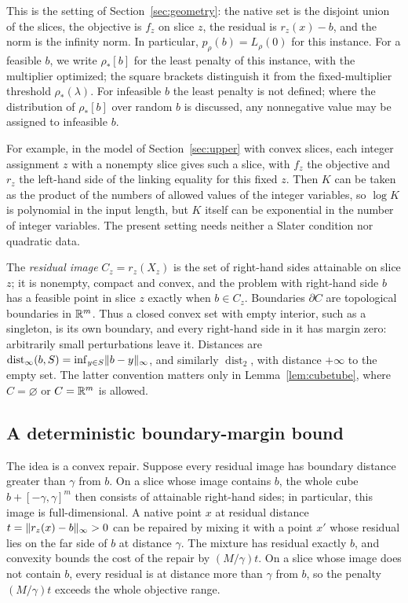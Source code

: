 This is the setting of Section~\ref{sec:geometry}: the native set is the
disjoint union of the slices, the objective is $f_z$ on slice $z$, the
residual is $r_z(x)-b$, and the norm is the infinity norm. In particular,
$p_\rho(b)=L_\rho(0)$ for this instance. For a feasible $b$, we write
$\rho_*[b]$ for the least penalty of this instance, with the multiplier
optimized; the square brackets distinguish it from the fixed-multiplier
threshold $\rho_*(\lambda)$. For infeasible $b$ the least penalty is not
defined; where the distribution of $\rho_*[b]$ over random $b$ is
discussed, any nonnegative value may be assigned to infeasible $b$.

For example, in the model of Section~\ref{sec:upper} with convex slices,
each integer assignment $z$ with a nonempty slice gives such a slice,
with $f_z$ the objective and $r_z$ the left-hand side of the linking
equality for this fixed $z$. Then $K$ can be taken as the product of the
numbers of allowed values of the integer variables, so $\log K$ is
polynomial in the input length, but $K$ itself can be exponential in the
number of integer variables. The present setting needs neither a Slater condition nor
quadratic data.

The \emph{residual image} $C_z=r_z(X_z)$ is the set of right-hand sides
attainable on slice $z$; it is nonempty, compact and convex, and the
problem with right-hand side $b$ has a feasible point in slice $z$
exactly when $b\in C_z$.
Boundaries $\partial C$ are topological boundaries in $\mathbb R^m$. Thus a
closed convex set with empty interior, such as a singleton, is its own
boundary, and every right-hand side in it has margin zero: arbitrarily
small perturbations leave it. Distances are
$\operatorname{dist}_\infty(b,S)=\inf_{y\in S}\lVert b-y\rVert_\infty$, and
similarly $\operatorname{dist}_2$, with distance $+\infty$ to the empty
set. The latter convention matters only in Lemma~\ref{lem:cubetube},
where $C=\varnothing$ or $C=\mathbb R^m$ is allowed.

\subsection{A deterministic boundary-margin bound}
The idea is a convex repair. Suppose every residual image has boundary
distance greater than $\gamma$ from $b$. On a slice whose image contains
$b$, the whole cube $b+[-\gamma,\gamma]^m$ then consists of attainable
right-hand sides; in particular, this image is full-dimensional. A native
point $x$ at residual distance $t=\lVert r_z(x)-b\rVert_\infty>0$ can be
repaired by mixing it with a point $x'$ whose residual lies on the far
side of $b$ at distance $\gamma$. The mixture has residual exactly $b$,
and convexity bounds the cost of the repair by $(M/\gamma)t$. On a slice
whose image does not contain $b$, every residual is at distance more than
$\gamma$ from $b$, so the penalty $(M/\gamma)t$ exceeds the whole
objective range.

